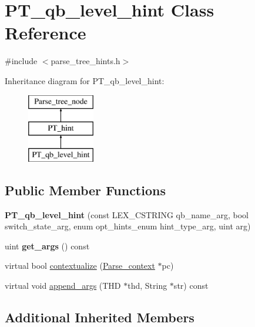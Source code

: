\hypertarget{classPT__qb__level__hint}{}\section{P\+T\+\_\+qb\+\_\+level\+\_\+hint Class Reference}
\label{classPT__qb__level__hint}


{\ttfamily \#include $<$parse\+\_\+tree\+\_\+hints.\+h$>$}

Inheritance diagram for P\+T\+\_\+qb\+\_\+level\+\_\+hint\+:\begin{figure}[H]
\begin{center}
\leavevmode
\includegraphics[height=3.000000cm]{classPT__qb__level__hint}
\end{center}
\end{figure}
\subsection*{Public Member Functions}
\begin{DoxyCompactItemize}
\item 
\mbox{\label{classPT__qb__level__hint_a050739c82fe046eab6127fc2a434b0ec}} 
{\bfseries P\+T\+\_\+qb\+\_\+level\+\_\+hint} (const L\+E\+X\+\_\+\+C\+S\+T\+R\+I\+NG qb\+\_\+name\+\_\+arg, bool switch\+\_\+state\+\_\+arg, enum opt\+\_\+hints\+\_\+enum hint\+\_\+type\+\_\+arg, uint arg)
\item 
\mbox{\label{classPT__qb__level__hint_a83623aae0d3e338f4640a9a704e23c39}} 
uint {\bfseries get\+\_\+args} () const
\item 
virtual bool \mbox{\hyperlink{classPT__qb__level__hint_afb73e765fbf59fa0d2ffbe72d33975be}{contextualize}} (\mbox{\hyperlink{structParse__context}{Parse\+\_\+context}} $\ast$pc)
\item 
virtual void \mbox{\hyperlink{classPT__qb__level__hint_a7eb50bc395daa14498c03d9753bbf4a4}{append\+\_\+args}} (T\+HD $\ast$thd, String $\ast$str) const
\end{DoxyCompactItemize}
\subsection*{Additional Inherited Members}


